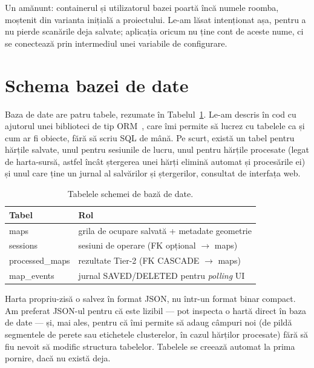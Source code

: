 \documentclass[a4paper,12pt,twoside,openany]{report}
\renewcommand{\texttt}[1]{\textnormal{#1}}
\begin{document}
Un amănunt: containerul și utilizatorul bazei poartă încă numele
\texttt{roomba}, moștenit din varianta inițială a proiectului. Le-am lăsat
intenționat așa, pentru a nu pierde scanările deja salvate; aplicația oricum nu
ține cont de aceste nume, ci se conectează prin intermediul unei variabile de
configurare.

\section{Schema bazei de date}
\label{sec:db-schema}

Baza de date are patru tabele, rezumate în Tabelul~\ref{tab:db-schema}. Le-am
descris în cod cu ajutorul unei biblioteci de tip ORM~\cite{sqlalchemy}, care
îmi permite să lucrez cu tabelele ca și cum ar fi obiecte, fără să scriu SQL de
mână. Pe scurt, există un tabel pentru hărțile salvate, unul pentru sesiunile
de lucru, unul pentru hărțile procesate (legat de harta-sursă, astfel încât
ștergerea unei hărți elimină automat și procesările ei) și unul care ține un
jurnal al salvărilor și ștergerilor, consultat de interfața web.

\begin{table}[H]
\centering
\caption{Tabelele schemei de bază de date.}
\label{tab:db-schema}
\renewcommand{\arraystretch}{1.15}
\begin{tabular}{ll}
\toprule
\textbf{Tabel} & \textbf{Rol} \\
\midrule
\texttt{maps}           & grila de ocupare salvată + metadate geometrie \\
\texttt{sessions}       & sesiuni de operare (FK opțional $\to$ \texttt{maps}) \\
\texttt{processed\_maps}& rezultate Tier-2 (FK CASCADE $\to$ \texttt{maps}) \\
\texttt{map\_events}    & jurnal SAVED/DELETED pentru \textit{polling} UI \\
\bottomrule
\end{tabular}
\end{table}

Harta propriu-zisă o salvez în format JSON, nu într-un format binar compact.
Am preferat JSON-ul pentru că este lizibil — pot inspecta o hartă direct în
baza de date — și, mai ales, pentru că îmi permite să adaug câmpuri noi (de
pildă segmentele de perete sau etichetele clusterelor, în cazul hărților
procesate) fără să fiu nevoit să modific structura tabelelor. Tabelele se
creează automat la prima pornire, dacă nu există deja.
\end{document}
